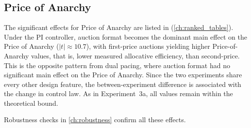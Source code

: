 \subsection{Price of Anarchy}

The significant effects for Price of Anarchy are listed in  (\cref{ch:ranked_tables}). Under the PI controller, auction format becomes the dominant main effect on the Price of Anarchy ($|t| \approx 10.7$), with first-price auctions yielding higher Price-of-Anarchy values, that is, lower measured allocative efficiency, than second-price. This is the opposite pattern from dual pacing, where auction format had no significant main effect on the Price of Anarchy. Since the two experiments share every other design feature, the between-experiment difference is associated with the change in control law. As in Experiment~3a, all values remain within the theoretical bound.

Robustness checks in \cref{ch:robustness} confirm all these effects.
